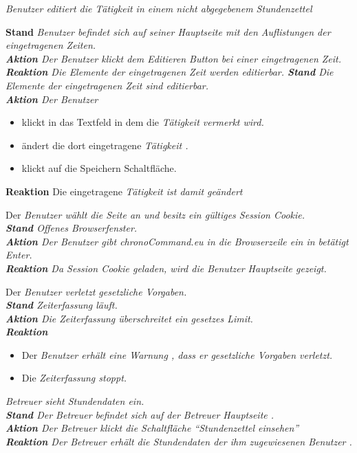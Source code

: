 \begin{requirements}
	 \em Benutzer \em editiert die \em Tätigkeit \em in einem \em nicht abgegebenem \em \em Stundenzettel \em
	\begin{requirements}
	        \textbf{Stand} \em Benutzer \em befindet sich auf seiner \em Hauptseite \em mit den Auflistungen der eingetragenen Zeiten. \\
	        \textbf{Aktion} Der \em Benutzer \em klickt dem Editieren Button bei einer eingetragenen Zeit.\\
            \textbf{Reaktion} Die Elemente der eingetragenen Zeit werden editierbar.
        \textbf{Stand} Die Elemente der eingetragenen Zeit sind editierbar. \\
        \textbf{Aktion} Der \em Benutzer \em
            \begin{itemize}
                \item klickt in das Textfeld in dem die \em Tätigkeit \em vermerkt wird.
                \item ändert die dort eingetragene \em Tätigkeit \em.
                \item klickt auf die Speichern Schaltfläche.
            \end{itemize}
            \textbf{Reaktion} Die eingetragene \em Tätigkeit \em ist damit geändert
    \end{requirements}

     Der \em Benutzer \em wählt die Seite an und besitz ein gültiges Session Cookie. \\
        \textbf{Stand} Offenes Browserfenster. \\
        \textbf{Aktion} Der \em Benutzer \em gibt chronoCommand.eu in die Browserzeile ein in betätigt Enter. \\
        \textbf{Reaktion} Da Session Cookie geladen, wird die \em Benutzer Hauptseite \em gezeigt.

     Der \em Benutzer \em verletzt gesetzliche Vorgaben. \\
        \textbf{Stand} \em Zeiterfassung \em läuft. \\
        \textbf{Aktion} Die \em Zeiterfassung \em überschreitet ein gesetzes Limit. \\
        \textbf{Reaktion}
            \begin{itemize}
                \item Der \em Benutzer \em erhält eine \em Warnung \em, dass er gesetzliche Vorgaben verletzt.
                \item Die \em Zeiterfassung \em stoppt.
            \end{itemize}

     \em Betreuer \em sieht \em Stundendaten \em ein. \\
        \textbf{Stand} Der \em Betreuer \em befindet sich auf der \em Betreuer Hauptseite \em. \\
        \textbf{Aktion} Der \em Betreuer \em klickt die Schaltfläche "`Stundenzettel einsehen"' \\
        \textbf{Reaktion} Der \em Betreuer \em erhält die \em Stundendaten \em der ihm zugewiesenen \em Benutzer \em.

\end{requirements}

